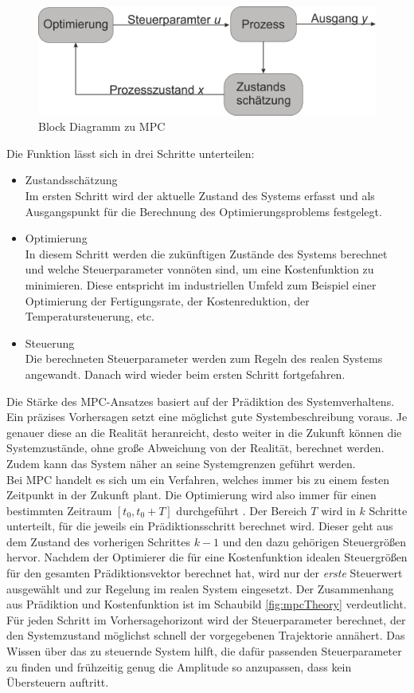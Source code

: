 \documentclass{like}
\begin{document}
  \begin{figure}[ht!]
  	\centering
  	\includegraphics[width=350pt]{Abbildungen/mpcBlockDiagram.png}
  	\caption{Block Diagramm zu MPC}
  	\label{fig:mpcBlock}
  \end{figure}

Die Funktion lässt sich in drei Schritte unterteilen:
\begin{itemize}
	\item Zustandsschätzung \\ Im ersten Schritt wird der aktuelle Zustand des Systems erfasst und als Ausgangspunkt für die Berechnung des Optimierungsproblems festgelegt.
	\item Optimierung \\ In diesem Schritt werden die zukünftigen Zustände des Systems berechnet und welche Steuerparameter vonnöten sind, um eine Kostenfunktion zu minimieren. Diese entspricht im industriellen Umfeld zum Beispiel einer Optimierung der Fertigungsrate, der Kostenreduktion,  der Temperatursteuerung, etc.
	\item Steuerung \\ Die berechneten Steuerparameter werden zum Regeln des realen Systems angewandt. Danach wird wieder beim ersten Schritt fortgefahren.   
\end{itemize}


Die Stärke des \ac{MPC}-Ansatzes basiert auf der Prädiktion des Systemverhaltens. Ein präzises Vorhersagen setzt eine möglichst gute Systembeschreibung voraus. Je genauer diese an die Realität heranreicht, desto weiter in die Zukunft können die Systemzustände, ohne große Abweichung von der Realität, berechnet werden. Zudem kann das System näher an seine Systemgrenzen geführt werden. \\
Bei \ac{MPC} handelt es sich um ein Verfahren, welches immer bis zu einem festen Zeitpunkt in der Zukunft plant. Die Optimierung wird also immer für einen bestimmten Zeitraum $ [t_0, t_0 + T] $ durchgeführt . Der Bereich \(T\) wird in \(k\) Schritte unterteilt, für die jeweils ein Prädiktionsschritt berechnet wird. Dieser geht aus dem Zustand des vorherigen Schrittes $k -1$ und den dazu gehörigen Steuergrößen hervor. Nachdem der Optimierer die für eine Kostenfunktion idealen Steuergrößen für den gesamten Prädiktionsvektor berechnet hat, wird nur der \emph{erste} Steuerwert ausgewählt und zur Regelung im realen System eingesetzt. Der Zusammenhang aus Prädiktion und Kostenfunktion ist im Schaubild \ref{fig:mpcTheory} verdeutlicht. Für jeden Schritt im Vorhersagehorizont wird der Steuerparameter berechnet, der den Systemzustand möglichst schnell der vorgegebenen Trajektorie annähert. Das Wissen über das zu steuernde System hilft, die dafür passenden Steuerparameter zu finden und frühzeitig genug die Amplitude so anzupassen, dass kein Übersteuern auftritt. 
\end{document}
